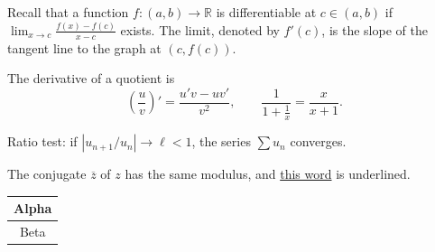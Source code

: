 \documentclass[11pt]{article}
\begin{document}
Recall that a function $f:(a,b)\to\mathbb{R}$ is differentiable at $c\in(a,b)$ if $\lim_{x\to c}\frac{f(x)-f(c)}{x-c}$ exists. The limit, denoted by $f'(c)$, is the slope of the tangent line to the graph at $(c,f(c))$.

The derivative of a quotient is
\[\left(\frac{u}{v}\right)'=\frac{u'v-uv'}{v^2},\qquad \frac{1}{1+\frac{1}{x}}=\frac{x}{x+1}.\]

Ratio test: if $|u_{n+1}/u_n|\to\ell<1$, the series $\sum u_n$ converges.

The conjugate $\overline{z}$ of $z$ has the same modulus, and \underline{this word} is underlined.

\begin{tabular}{|c|}\hline Alpha\\\hline Beta\\\hline\end{tabular}
\end{document}
